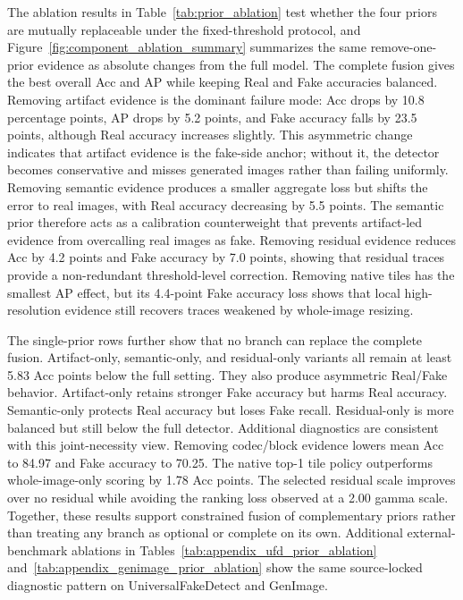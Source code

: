 \documentclass[lettersize,journal]{IEEEtran}
\begin{document}
The ablation results in Table~\ref{tab:prior_ablation} test whether the four priors are mutually replaceable under the fixed-threshold protocol, and Figure~\ref{fig:component_ablation_summary} summarizes the same remove-one-prior evidence as absolute changes from the full model. The complete fusion gives the best overall Acc and AP while keeping Real and Fake accuracies balanced. Removing artifact evidence is the dominant failure mode: Acc drops by 10.8 percentage points, AP drops by 5.2 points, and Fake accuracy falls by 23.5 points, although Real accuracy increases slightly. This asymmetric change indicates that artifact evidence is the fake-side anchor; without it, the detector becomes conservative and misses generated images rather than failing uniformly. Removing semantic evidence produces a smaller aggregate loss but shifts the error to real images, with Real accuracy decreasing by 5.5 points. The semantic prior therefore acts as a calibration counterweight that prevents artifact-led evidence from overcalling real images as fake. Removing residual evidence reduces Acc by 4.2 points and Fake accuracy by 7.0 points, showing that residual traces provide a non-redundant threshold-level correction. Removing native tiles has the smallest AP effect, but its 4.4-point Fake accuracy loss shows that local high-resolution evidence still recovers traces weakened by whole-image resizing.

The single-prior rows further show that no branch can replace the complete fusion. Artifact-only, semantic-only, and residual-only variants all remain at least 5.83 Acc points below the full setting. They also produce asymmetric Real/Fake behavior. Artifact-only retains stronger Fake accuracy but harms Real accuracy. Semantic-only protects Real accuracy but loses Fake recall. Residual-only is more balanced but still below the full detector. Additional diagnostics are consistent with this joint-necessity view. Removing codec/block evidence lowers mean Acc to 84.97 and Fake accuracy to 70.25. The native top-1 tile policy outperforms whole-image-only scoring by 1.78 Acc points. The selected residual scale improves over no residual while avoiding the ranking loss observed at a 2.00 gamma scale. Together, these results support constrained fusion of complementary priors rather than treating any branch as optional or complete on its own. Additional external-benchmark ablations in Tables~\ref{tab:appendix_ufd_prior_ablation} and~\ref{tab:appendix_genimage_prior_ablation} show the same source-locked diagnostic pattern on UniversalFakeDetect and GenImage.
\end{document}
